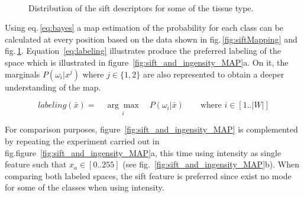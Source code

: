 \documentclass[a4paper, 10pt, conference]{llncs}      %
\begin{document}
\begin{figure}[Htbp]
\begin{tikzpicture}
\end{tikzpicture} \\
\caption{Distribution of the \acs{sift} descriptors for some of the tissue type.}%
\label{fig:P_class_knowing_features}
\end{figure}

Using eq.\,\ref{eq:bayes} a \ac{map} estimation of the probability for each class can be calculated at every position based on the data shown in fig.\,\ref{fig:siftMapping} and fig.\,\ref{fig:P_class_knowing_features}.
Equation~\ref{eq:labeling} illustrates produce the preferred labeling of the space which is illustrated in figure~\ref{fig:sift_and_ingensity_MAP}a. On it, the marginals $P(\omega_i|x^j)$ where $j\in \{1,2\}$ are also represented to obtain a deeper understanding of the \ac{map}.

\begin{equation}
labeling(\bar{x}) = \quad\underset{i}{\arg\max}\quad P(\omega_i|\bar{x})
\label{eq:labeling} \qquad \text{where } i \in [1 .. |W|] 
\end{equation}

For comparison purposes, figure~\ref{fig:sift_and_ingensity_MAP} is complemented by repeating the experiment carried out in fig.figure~\ref{fig:sift_and_ingensity_MAP}a, this time using intensity as single feature such that $x_a \in [0 .. 255]$ (see fig.~\ref{fig:sift_and_ingensity_MAP}b). When comparing both labeled spaces, the \ac{sift} feature is preferred since exist no mode for some of the classes when using intensity.
\end{document}
